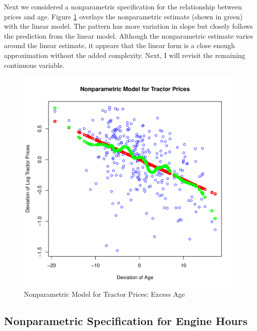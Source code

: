 Next we considered a nonparametric specification for 
the relationship between prices and age.
% 
Figure \ref{fig:dev_np_vs_age_dev} 
overlays the nonparametric estimate (shown in green) 
with the linear model.
The pattern has more variation in slope but 
closely follows the prediction from the linear model. 
Although the nonparametric estimate varies around the linear estimate,
it appears that the linear form
is a close enough approximation without the added complexity.
Next, I will revisit the remaining continuous variable.


\begin{figure}[h!]
  \centering
  \includegraphics[scale = 0.5, keepaspectratio=true]{../Figures/dev_np_vs_age_dev}
  \caption{Nonparametric Model for Tractor Prices: Excess Age} \label{fig:dev_np_vs_age_dev}
\end{figure}





\clearpage
\subsection{Nonparametric Specification for Engine Hours}

